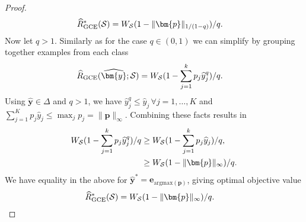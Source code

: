 \documentclass[letterpaper]{article} %
\newcommand{\bx}{{\bm{x}}}
\newcommand{\bp}{{\bm{p}}}
\newcommand{\by}{{\bm{y}}}
\newcommand{\be}{{\bm{e}}}
\newcommand{\T}{{\mathsf{T}}}
\newcommand{\cS}{{\cal{S}}}
\newcommand{\WS}{{W_{\cal{S}}}}
\newcommand{\simplex}{\Delta}
\newcommand{\argmax}{\mathrm{argmax}}
\begin{document}
\begin{proof}
    \begin{align*}
        \widehat{R}_{\mathrm{GCE}}^*(\cS) 
        &= \WS(1-\|\bp\|_{1/(1-q)})/q.
    \end{align*}
    Now let $q>1$. Similarly as for the case $q\in(0,1)$ we can simplify by grouping together examples from each class
    \begin{align*}
        \widehat{R}_{\mathrm{GCE}}(\widehat{\by};\cS) 
        &= \WS(1-\sum_{j=1}^k p_j\widehat{y}_j^q)/q.
    \end{align*}
    Using $\widehat{\by} \in \simplex$ and $q>1$, we have $\widehat{y}_j^q\leq \widehat{y}_j\,\forall j=1,\ldots,K$ and
    $\sum_{j=1}^K p_j\widehat{y}_j\leq \max_{j}p_j=\|\bp\|_\infty$. Combining these facts results in 
    \begin{align*}
        \WS(1-\sum_{j=1}^k p_j\widehat{y}_j^q)/q 
        &\geq \WS(1-\sum_{j=1}^k p_j\widehat{y}_j)/q, 
        \\
        &\geq \WS(1-\|\bp\|_\infty )/q.%
    \end{align*}
    We have equality in the above for $\widehat{\by}^*=\be_{\argmax(\bp)}$, giving optimal objective value
    \begin{align*}
        \widehat{R}_{\mathrm{GCE}}^*(\cS) &= \WS(1-\|\bp\|_\infty)/q.
    \end{align*}
    

\end{proof}
\end{document}
